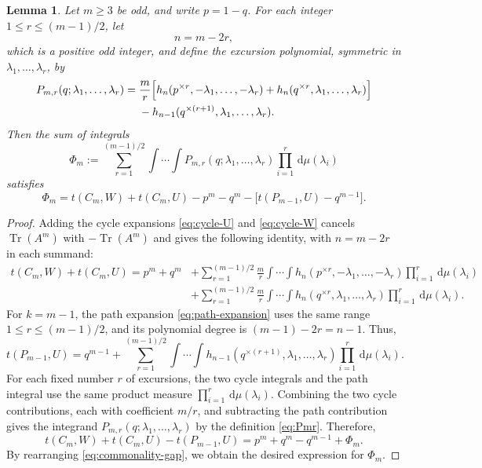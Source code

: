 \documentclass[11pt]{article}
\newtheorem{lemma}[theorem]{Lemma}
\theoremstyle{remark}
\numberwithin{equation}{section}
\newcommand{\Tr}{\operatorname{Tr}}
\newcommand{\dd}{\,\mathrm d}
\newcommand{\tC}[2]{t(C_{#1},#2)}
\newcommand{\tP}[2]{t(P_{#1},#2)}
\newcommand{\rep}[2]{#1^{\times #2}}
\begin{document}
\begin{lemma}
\label{lem:polynomial-reduction}
  Let $m\ge3$ be odd, and write $p=1-q$. For each integer
  $1\le r\le(m-1)/2$, let
  \begin{equation}\label{eq:pge23-n}
    n=m-2r,
  \end{equation}
  which is a positive odd integer, and define the excursion polynomial,
  symmetric in $\lambda_1,\ldots,\lambda_r$, by
  \begin{align}
    P_{m,r}(q;\lambda_1,\ldots,\lambda_r)
    ={}&\frac mr\Bigl[
      h_n(\rep pr,-\lambda_1,\ldots,-\lambda_r)
      +h_n(\rep qr,\lambda_1,\ldots,\lambda_r)
    \Bigr]\notag\\
    &-h_{n-1}(\rep q{(r+1)},\lambda_1,\ldots,\lambda_r).
    \label{eq:Pmr}
  \end{align}
  Then the sum of integrals
  \begin{equation}\label{eq:Phi-expansion}
    \Phi_m:=\sum_{r=1}^{(m-1)/2}
      \int\!\cdots\!\int
      P_{m,r}(q;\lambda_1,\ldots,\lambda_r)
      \prod_{i=1}^r\dd\mu(\lambda_i)
  \end{equation}
  satisfies
  \[
    \Phi_m=\tC mW+\tC mU-p^m-q^m
    -\bigl[\tP{m-1}U-q^{m-1}\bigr].
  \]
\end{lemma}

\begin{proof}
  Adding the cycle expansions \eqref{eq:cycle-U} and
  \eqref{eq:cycle-W} cancels $\Tr(A^m)$ with $-\Tr(A^m)$ and gives the
  following identity, with $n=m-2r$ in each summand:
  \[
    \begin{aligned}
      \tC mW+\tC mU
      ={}p^m+q^m
      &+\sum_{r=1}^{(m-1)/2}\frac mr
      \int\!\cdots\!\int
        h_n(\rep pr,-\lambda_1,\ldots,-\lambda_r)
      \prod_{i=1}^r\dd\mu(\lambda_i)\\
      &+\sum_{r=1}^{(m-1)/2}\frac mr
      \int\!\cdots\!\int
        h_n(\rep qr,\lambda_1,\ldots,\lambda_r)
      \prod_{i=1}^r\dd\mu(\lambda_i).
    \end{aligned}
  \]
  For $k=m-1$, the path expansion \eqref{eq:path-expansion} uses the
  same range $1\le r\le(m-1)/2$, and its polynomial degree is
  $(m-1)-2r=n-1$. Thus,
  \[
    \tP{m-1}U=q^{m-1}+
    \sum_{r=1}^{(m-1)/2}
      \int\!\cdots\!\int
      h_{n-1}(\rep q{(r+1)},\lambda_1,\ldots,\lambda_r)
      \prod_{i=1}^r\dd\mu(\lambda_i).
  \]
  For each fixed number $r$ of excursions, the two cycle integrals and
  the path integral use the same product measure
  $\prod_{i=1}^r\dd\mu(\lambda_i)$.
  Combining the two cycle contributions, each with coefficient $m/r$, and subtracting the path contribution gives the integrand $P_{m,r}(q;\lambda_1,\ldots,\lambda_r)$ by the definition \eqref{eq:Pmr}.
  Therefore,
  \begin{equation}\label{eq:commonality-gap}
    \tC mW+\tC mU-\tP{m-1}U
    =p^m+q^m-q^{m-1}+\Phi_m.
  \end{equation}
  By rearranging \eqref{eq:commonality-gap}, we obtain the desired expression for $\Phi_m$.
\end{proof}
\end{document}
